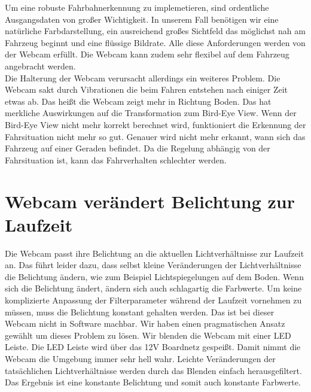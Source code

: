 Um eine robuste Fahrbahnerkennung zu implemetieren, sind ordentliche Ausgangsdaten von großer Wichtigkeit.
In unserem Fall benötigen wir eine natürliche Farbdarstellung, ein ausreichend großes Sichtfeld das möglichst nah am Fahrzeug beginnt und eine flüssige Bildrate. 
Alle diese Anforderungen werden von der Webcam erfüllt.
Die Webcam kann zudem sehr flexibel auf dem Fahrzeug angebracht werden.
\\
Die Halterung der Webcam verursacht allerdings ein weiteres Problem.
Die Webcam sakt durch Vibrationen die beim Fahren entstehen nach einiger Zeit etwas ab.
Das heißt die Webcam zeigt mehr in Richtung Boden.
Das hat merkliche Auswirkungen auf die Transformation zum Bird-Eye View.
Wenn der Bird-Eye View nicht mehr korrekt berechnet wird, funktioniert die Erkennung der Fahrsituation nicht mehr so gut.
Genauer wird nicht mehr erkannt, wann sich das Fahrzeug auf einer Geraden befindet.
Da die Regelung abhängig von der Fahrsituation ist, kann das Fahrverhalten schlechter werden.

\section{Webcam verändert Belichtung zur Laufzeit}
\label{sec:belichtung}
Die Webcam passt ihre Belichtung an die aktuellen Lichtverhältnisse zur Laufzeit an.
Das führt leider dazu, dass selbst kleine Veränderungen der Lichtverhältnisse die Belichtung ändern, wie zum Beispiel Lichtspiegelungen auf dem Boden.
Wenn sich die Belichtung ändert, ändern sich auch schlagartig die Farbwerte.
Um keine komplizierte Anpassung der Filterparameter während der Laufzeit vornehmen zu müssen, muss die Belichtung konstant gehalten werden.
Das ist bei dieser Webcam nicht in Software machbar.
Wir haben einen pragmatischen Ansatz gewählt um dieses Problem zu lösen.
Wir blenden die Webcam mit einer LED Leiste.
Die LED Leiste wird über das 12V Boardnetz gespeißt.
Damit nimmt die Webcam die Umgebung immer sehr hell wahr.
Leichte Veränderungen der tatsächlichen Lichtverhältnisse werden durch das Blenden einfach herausgefiltert. 
Das Ergebnis ist eine konstante Belichtung und somit auch konstante Farbwerte.

